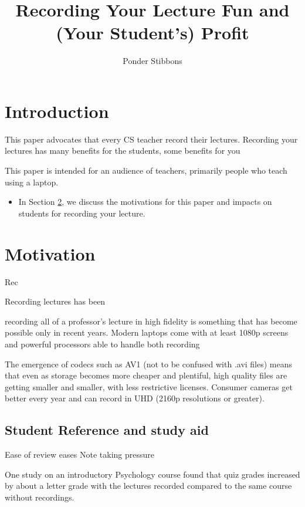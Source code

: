\documentclass[sigconf]{acmart}
\title{Recording Your Lecture Fun and (Your Student's) Profit}
\author{Ponder Stibbons}
\affiliation{\institution{Unseen University}}
\begin{document}
\maketitle



\section{Introduction}


This paper advocates that every CS teacher record their lectures.
Recording your lectures has many benefits for the students, some benefits for you

This paper is intended for an audience of teachers, primarily people who teach using a laptop.




\begin{itemize}
	\item In Section \ref{why}, we discuss the motivations for this paper and impacts  on students for recording your lecture.
\end{itemize}
\section{Motivation}
\label{why}
Rec

Recording lectures has been

recording all of a professor's lecture in high fidelity is something that has become possible only in recent years.
Modern laptops come with at least 1080p screens and powerful processors able to handle both recording 

The emergence of codecs such as AV1 \cite{AV1comp} (not to be confused with .avi files) means that even as storage becomes more cheaper and plentiful, high quality files are getting smaller and smaller, with less restrictive licenses. 
Consumer cameras get better every year and can record in UHD (2160p resolutions or greater).


\subsection{Student Reference and study aid}


Ease of review
eases Note taking pressure


One study \cite{shimoff2001effects}  on an introductory Psychology course found that quiz grades increased by about a letter grade with the lectures recorded compared to the same course without recordings.
\end{document}
